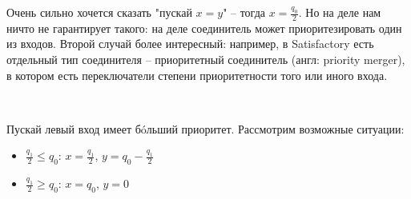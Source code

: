 \vspace{0.5in}

Очень сильно хочется сказать "пускай $x=y$" -- тогда $x = \frac{q_0}2$. Но на деле нам ничто не гарантирует такого: на деле соединитель может приоритезировать один из входов. Второй случай более интересный: например, в Satisfactory есть отдельный тип соединителя -- приоритетный соединитель (англ: priority merger), в котором есть переключатели степени приоритетности того или иного входа.

\

\noindent Пускай левый вход имеет бóльший приоритет. Рассмотрим возможные ситуации:

\begin{itemize}
	\item $\frac{q_1}2 \le q_0$: $x = \frac{q_1}2$, $y = q_0 - \frac{q_1}2$
	
	\item $\frac{q_1}2 \ge q_0$: $x = q_0$, $y = 0$
\end{itemize}






\vspace{0.5in}

